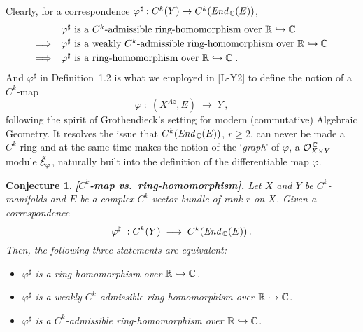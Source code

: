 \documentclass[11pt]{article}
\numberwithin{equation}{subsection}
\newtheorem{sconjecture}[stheorem]{Conjecture}
\newcommand{\End}{\mbox{\it End}\,}
\begin{document}
Clearly, for a correspondence $\varphi^{\sharp}:C^k(Y)\rightarrow C^k(\End_{\Bbb C}(E))$,
 $$
  \begin{array}{cl}
      & \mbox{$\varphi^{\sharp}$ is a $C^k$-admissible ring-homomorphism
  	                      over ${\Bbb R}\hookrightarrow {\Bbb C}$} \\[.6ex]
	\Longrightarrow
      & \mbox{$\varphi^{\sharp}$ is a weakly $C^k$-admissible ring-homomorphism
	                      over ${\Bbb R}\hookrightarrow{\Bbb C}$}\\[.6ex]
    \Longrightarrow
      & \mbox{$\varphi^{\sharp}$ is a ring-homomorphism
	                      over ${\Bbb R}\hookrightarrow{\Bbb C}$}\;.
  \end{array}	
 $$
And $\varphi^{\sharp}$ in Definition~1.2
 is what we employed in [L-Y2] to define the notion of a $C^k$-map
 $$
   \varphi\; :\;  (X^{\!A\!z},E)\; \longrightarrow\; Y\,,
 $$
 following the spirit of Grothendieck's setting for modern (commutative) Algebraic Geometry.
It resolves
 the issue that $C^k(\End_{\Bbb C}(E))$, $r\ge 2$, can never be made a $C^k$-ring
 and at the same time makes
     the notion of the `{\it graph}' of $\varphi$,
	 a ${\cal O}_{X\times Y}^{\,\Bbb C}$-module $\tilde{\cal E}_{\varphi}$,
   naturally built into the definition of the differentiable map $\varphi$.

\bigskip

\begin{sconjecture} {\bf [$C^k$-map vs.\ ring-homomorphism].}
 Let
   $X$ and $Y$ be $C^k$-manifolds  and $E$ be a complex $C^k$ vector bundle of rank $r$ on $X$.
 Given a correspondence
   $$
     \varphi^{\sharp}\;: C^k(Y)\;\longrightarrow\; C^k(\End_{\Bbb C}(E))\,.
   $$
 Then, the following three statements are equivalent:
   \begin{itemize}
     \item[\rm (1)]
	  $\varphi^{\sharp}$ is a ring-homomorphism over ${\Bbb R}\hookrightarrow {\Bbb C}$.
	
     \item[\rm (2)]
	  $\varphi^{\sharp}$ is a weakly $C^k$-admissible ring-homomorphism
	   over ${\Bbb R}\hookrightarrow {\Bbb C}$.
	
	 \item[\rm (3)]
	  $\varphi^{\sharp}$ is a $C^k$-admissible ring-homomorphism
	   over ${\Bbb R}\hookrightarrow {\Bbb C}$.
   \end{itemize}
\end{sconjecture}
\end{document}
